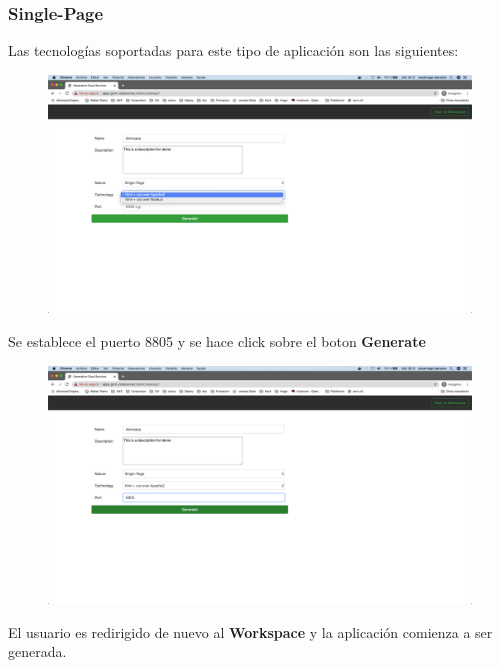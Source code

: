 \documentclass[a4paper,11pt]{book}
\begin{document}
\subsubsection{Single-Page}

Las tecnologías soportadas para este tipo de aplicación son las siguientes: 

\begin{figure}[H]
\centering
\includegraphics[scale=0.2]{imagenes/casouso/7.png}
\caption{   }
\end{figure}

Se establece el puerto 8805 y se hace click sobre el boton \textbf{Generate}
\begin{figure}[H]
\centering
\includegraphics[scale=0.2]{imagenes/casouso/8.png}
\caption{   }
\end{figure}

El usuario es redirigido de nuevo al \textbf{Workspace} y la aplicación comienza a ser generada. 
\end{document}

